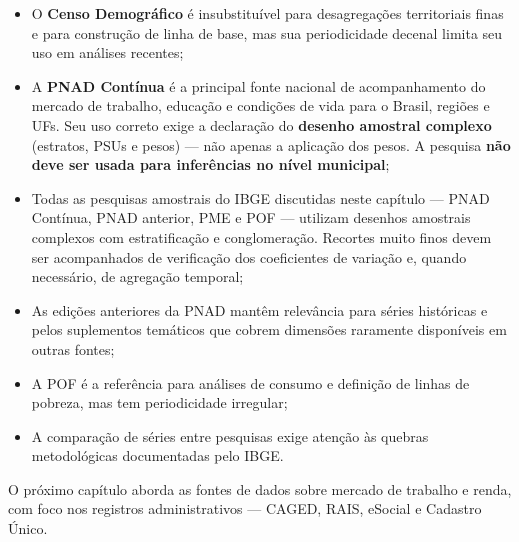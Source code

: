 \begin{itemize}
  \item O \textbf{Censo Demográfico} é insubstituível para desagregações territoriais finas e para construção de linha de base, mas sua periodicidade decenal limita seu uso em análises recentes;

  \item A \textbf{PNAD Contínua} é a principal fonte nacional de acompanhamento do mercado de trabalho, educação e condições de vida para o Brasil, regiões e UFs. Seu uso correto exige a declaração do \textbf{desenho amostral complexo} (estratos, PSUs e pesos) --- não apenas a aplicação dos pesos. A pesquisa \textbf{não deve ser usada para inferências no nível municipal};

  \item Todas as pesquisas amostrais do IBGE discutidas neste capítulo --- PNAD Contínua, PNAD anterior, PME e POF --- utilizam desenhos amostrais complexos com estratificação e conglomeração. Recortes muito finos devem ser acompanhados de verificação dos coeficientes de variação e, quando necessário, de agregação temporal;

  \item As edições anteriores da PNAD mantêm relevância para séries históricas e pelos suplementos temáticos que cobrem dimensões raramente disponíveis em outras fontes;

  \item A POF é a referência para análises de consumo e definição de linhas de pobreza, mas tem periodicidade irregular;

  \item A comparação de séries entre pesquisas exige atenção às quebras metodológicas documentadas pelo IBGE.
\end{itemize}

O próximo capítulo aborda as fontes de dados sobre mercado de trabalho e renda, com foco nos registros administrativos --- CAGED, RAIS, eSocial e Cadastro Único.
